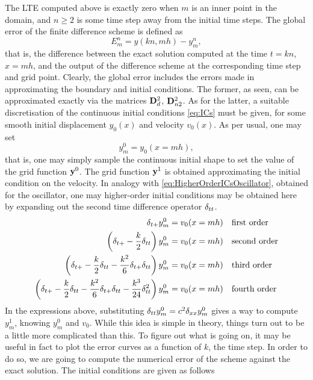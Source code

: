 The LTE computed above is exactly zero when $m$ is an inner point in the domain, and $n \geq 2$ is some time step away from the initial time steps. The global error of the finite difference scheme is defined as
\begin{equation}\label{eq:ErrWaveEqn}
E^n_m = y(kn,mh)-y^n_m,
\end{equation}
that is, the difference between the exact solution computed at the time $t=kn$, $x=mh$, and the output of the difference scheme at the corresponding time step and grid point. Clearly, the global error includes the errors made in approximating the boundary and initial conditions. The former, as seen, can be approximated exactly via the matrices ${\bf D}^2_{d}$, ${\bf D}^2_{n2}$. As for the latter, a suitable discretisation of the continuous initial conditions \eqref{eq:ICs} must be given, for some smooth initial displacement $y_0(x)$ and velocity $v_0(x)$. As per usual, one may set
\begin{equation}\label{eq:y0m}
y^0_m = y_0(x=mh),
\end{equation}
that is, one may simply sample the continuous initial shape to set the value of the grid function ${\bf y}^0$. The grid function ${\bf y}^1$ is obtained approximating the initial condition on the velocity. In analogy with \eqref{eq:HigherOrderICsOscillator}, obtained for the oscillator, one may higher-order initial conditions may be obtained here by expanding out the second time difference operator $\delta_{tt}$. 
\begin{subequations}\label{eq:HigherOrderICsWE}
\begin{align}
\delta_{t+} y^0_m &= v_0(x=mh) \quad \text{first order} \label{eq:HigherOrderICsWE1}\\
\left(\delta_{t+} -\frac{k}{2}\delta_{tt} \right) y^0_m &= v_0(x=mh) \quad \text{second order} \label{eq:HigherOrderICsWE2}\\
\left(\delta_{t+} -\frac{k}{2}\delta_{tt} - \frac{k^2}{6}\delta_{t+} \delta_{tt} \right) y^0_m &= v_0(x=mh) \quad \text{third order}\label{eq:HigherOrderICsWE3}\\
\left(\delta_{t+} -\frac{k}{2}\delta_{tt} - \frac{k^2}{6}\delta_{t+} \delta_{tt} - \frac{k^3}{24}\delta_{tt}^2 \right) y^0_m &= v_0(x=mh) \quad \text{fourth order}\label{eq:HigherOrderICsWE4}
\end{align}
\end{subequations}
In the expressions above, substituting $\delta_{tt} y^0_m = c^2 \delta_{xx} y^0_m$ gives a way to compute $y^1_m$, knowing $y^0_m$ and $v_0$. While this idea is simple in theory, things turn out to be a little more complicated than this. To figure out what is going on, it may be useful in fact to plot the error curves as a function of $k$, the time step. In order to do so, we are going to compute the numerical error of the scheme against the exact solution. The initial conditions are given as follows
